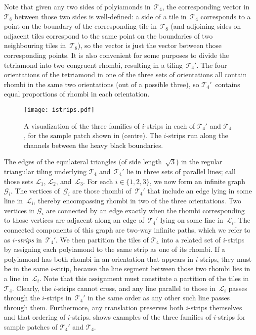 Note that given any two sides of polyiamonds in~$\mathcal{T}_4$, the
corresponding vector in~$\mathcal{T}_8$ between those two sides is
well-defined: a side of a tile in~$\mathcal{T}_4$ corresponds to a
point on the boundary of the corresponding tile in~$\mathcal{T}_8$
(and adjoining sides on adjacent tiles correspond to the same point on
the boundaries of two neighbouring tiles in~$\mathcal{T}_8$), so the
vector is just the vector between those corresponding points.  It is
also convenient for some purposes to divide the tetriamond into two
congruent rhombi, resulting in a tiling~$\mathcal{T}_4'$.  The four
orientations of the tetriamond in one of the three sets of
orientations all contain rhombi in the same two orientations (out of a
possible three), so $\mathcal{T}_4'$~contains equal proportions of
rhombi in each orientation.


\begin{figure}[t]
\begin{center}
\texttt{[image: istrips.pdf]}
\end{center}
\caption{\label{fig:istrips}A visualization of the three families of
	$i$-strips in each of $\mathcal{T}_4'$ and $\mathcal{T}_4$, for the 
	sample patch shown in  (centre).  The $i$-strips
	run along the channels between the heavy black boundaries.}
\end{figure}

The edges of the equilateral triangles (of side length~$\sqrt{3}$) in
the regular triangular tiling underlying $\mathcal{T}_4$
and~$\mathcal{T}_4'$ lie in three sets of parallel lines; call those
sets $\mathcal{L}_1$, $\mathcal{L}_2$, and~$\mathcal{L}_3$.  For each
$i\in\{1,2,3\}$, we now form an infinite graph~$\mathcal{G}_i$. 
The vertices of~$\mathcal{G}_i$ are 
those rhombi of~$\mathcal{T}_4'$ that include an edge
lying in some line in~$\mathcal{L}_i$, thereby encompassing rhombi
in two of the three orientations.
Two vertices in $\mathcal{G}_i$ are connected by an edge exactly
when the rhombi corresponding to those vertices are adjacent along an 
edge of~$\mathcal{T}_4'$ lying on some line in~$\mathcal{L}_i$.
The connected
components of this graph are two-way infinite paths, which we refer to
as \emph{$i$-strips} in~$\mathcal{T}_4'$.  
We then partition the tiles of $\mathcal{T}_4$ into a related set of 
$i$-strips by assigning each polyiamond to the same strip as one of its
rhombi.  If a
polyiamond has both rhombi in an orientation that appears in
$i$-strips, they must be in the same $i$-strip, because the line
segment between those two rhombi lies in a line in~$\mathcal{L}_i$.
Note that this assignment must constitute a partition of the tiles
in $\mathcal{T}_4$.
Clearly, the $i$-strips cannot cross, and any line
parallel to those in~$\mathcal{L}_i$ passes through the $i$-strips
in~$\mathcal{T}_4'$ in the same order as any other such line passes
through them.  Furthermore, any translation preserves both $i$-strips
themselves and that ordering of $i$-strips.   shows
examples of the three families of $i$-strips for sample patches of
$\mathcal{T}_4'$ and $\mathcal{T}_4$.

